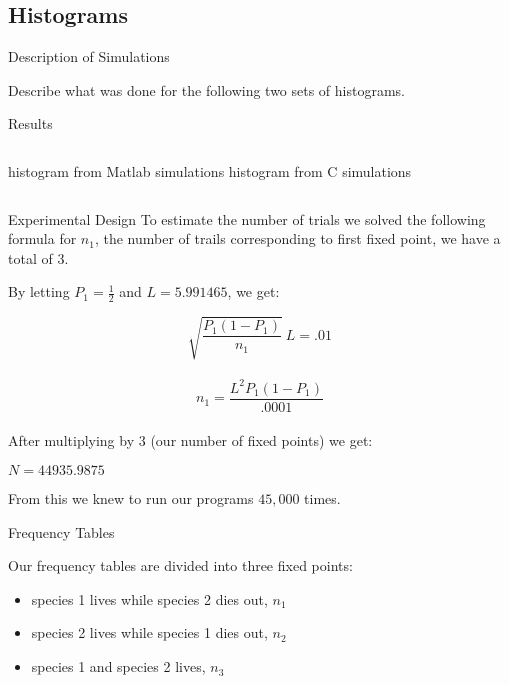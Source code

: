 
\subsection{Histograms}

\begin{frame}{Description of Simulations}

  Describe what was done for the following two sets of histograms.

\end{frame}


\begin{frame}{Results}
 

  \begin{columns}[t]
    histogram from Matlab simulations
    histogram from C simulations
  \end{columns}


\end{frame}





\begin{frame}{Experimental Design}
To estimate the number of trials we solved the following formula for $n_1$, the number of trails corresponding to first fixed point, we have a total of $3$. \\
	
	\vfill

By letting $P_1 = \frac{1}{2}$ and $L = 5.991465$, we get:

  $$\sqrt{\frac{P_1 (1-P_1)}{n_1}} \ L = .01$$ \\
  $$n_1 = \frac{L^2 P_1 (1-P_1)}{.0001}$$ \\
  After multiplying by $3$ (our number of fixed points) we get: \\
  \begin{center} $N = 44935.9875$ \end{center} 

  From this we knew to run our programs $45,000$ times. 
	
\vfill

\end{frame}

\begin{frame}{Frequency Tables}

		Our frequency tables are divided into three fixed points:
\begin{itemize}
	\item species 1 lives while species 2 dies out, $n_1$
	\item species 2 lives while species 1 dies out, $n_2$
	\item species 1 and species 2 lives, $n_3$
\end{itemize}

\end{frame}


